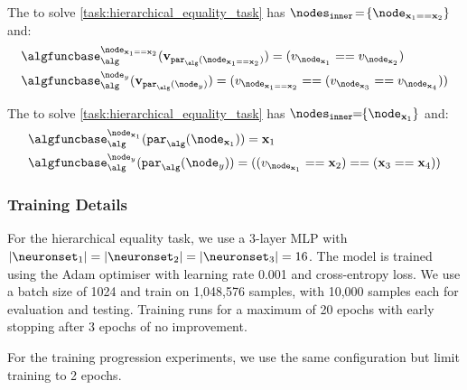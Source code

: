 \begin{causalgraph}\label{alg:left_equality_relation}
    The  to solve \cref{task:hierarchical_equality_task} has $\nodesinner\!=\!\{\node_{\bx_1\isequalsubscript\bx_2}\}$
    and:
    \begin{align}
        &\algfuncnode{\node_{\bx_1\isequalsubscript\bx_2}}(\nodesvalues_{\parents(\node_{\bx_1\isequalsubscript\bx_2})}) = 
        (\nodevalue_{\node_{\bx_1}} \isequal \nodevalue_{\node_{\bx_2}}) \nonumber\\
        &\algfuncnode{\node_{y}}(\nodesvalues_{\parents(\node_{y})}) =
        (\nodevalue_{\node_{\bx_1\isequalsubscript\bx_2}} \isequal (\nodevalue_{\node_{\bx_3}} \isequal \nodevalue_{\node_{\bx_4}}))\nonumber
    \end{align}
\end{causalgraph}

\begin{causalgraph}\label{alg:identityoffirst}
    The  to solve \cref{task:hierarchical_equality_task} has $\nodesinner\!\!=\!\!\{\node_{\bx_1}\}$
    and:
    \begin{align}
        &\algfuncnode{\node_{\bx_1}}(\parents(\node_{\bx_1})) = \bx_1 \nonumber \\
        &\algfuncnode{\node_{y}}(\parents(\node_{y})) = ((\nodevalue_{\node_{\bx_1}}==\bx_2)==(\bx_3==\bx_4))\nonumber
    \end{align}
\end{causalgraph}

\subsubsection{Training Details}\label{app:heq_training_details}

For the hierarchical equality task, we use a 3-layer MLP with $\lvert \neuronset_{1} \rvert = \lvert \neuronset_{2} \rvert = \lvert \neuronset_{3} \rvert = 16$. The model is trained using the Adam optimiser with learning rate 0.001 and cross-entropy loss. We use a batch size of 1024 and train on 1,048,576 samples, with 10,000 samples each for evaluation and testing. Training runs for a maximum of 20 epochs with early stopping after 3 epochs of no improvement.

For the training progression experiments, we use the same configuration but limit training to 2 epochs.

